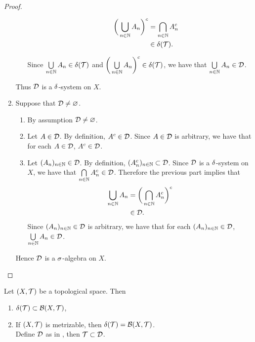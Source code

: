 \documentclass{book}
\begin{document}
\begin{proof}
\begin{enumerate}
\begin{enumerate}
\begin{itemize}
					\begin{align*}
						\bigg( \bigcup_{n \in \mathbb{N}} A_n \bigg)^c 
						& = \bigcap_{n \in \mathbb{N}} A_n^c \\
						& \in \delta(\mathcal{T}).
					\end{align*}
				\end{itemize}
				Since $\bigcup\limits_{n \in \mathbb{N}} A_n \in \delta(\mathcal{T})$ and $\bigg( \bigcup\limits_{n \in \mathbb{N}} A_n \bigg)^c \in \delta(\mathcal{T})$, we have that $\bigcup\limits_{n \in \mathbb{N}} A_n \in \mathcal{D}$. 
			\end{enumerate}
			Thus $\mathcal{D}$ is a $\delta$-system on $X$.
			\item Suppose that $\mathcal{D} \neq \varnothing$.
			\begin{enumerate}
				\item By assumption $\mathcal{D} \neq \varnothing$.
				\item Let $A \in \mathcal{D}$. By definition, $A^c \in \mathcal{D}$. Since $A \in \mathcal{D}$ is arbitrary, we have that for each $A \in \mathcal{D}$, $A^c \in \mathcal{D}$.
				\item Let $(A_n)_{n \in \mathbb{N}} \in \mathcal{D}$. By definition, $(A_n^c)_{n \in \mathbb{N}} \subset \mathcal{D}$. Since $\mathcal{D}$ is a $\delta$-system on $X$, we have that $\bigcap\limits_{n \in \mathbb{N}} A_n^c \in \mathcal{D}$. Therefore the previous part implies that
				\begin{align*}
					\bigcup_{n \in \mathbb{N}} A_n
					& = \bigg( \bigcap_{n \in \mathbb{N}} A_n^c \bigg)^c \\
					& \in \mathcal{D}. 
				\end{align*}
				Since $(A_n)_{n \in \mathbb{N}} \in \mathcal{D}$ is arbitrary, we have that for each $(A_n)_{n \in \mathbb{N}} \in \mathcal{D}$, $\bigcup\limits_{n \in \mathbb{N}} A_n \in \mathcal{D}$. 
			\end{enumerate}
			Hence $\mathcal{D}$ is a $\sigma$-algebra on $X$. 
		\end{enumerate}
	\end{proof}
	
	\begin{ex} 
		Let $(X, \mathcal{T})$ be a topological space. Then 
		\begin{enumerate}
			\item $\delta(\mathcal{T}) \subset \mathcal{B}(X, \mathcal{T})$,
			\item If $(X, \mathcal{T})$ is metrizable, then $\delta(\mathcal{T}) = \mathcal{B}(X, \mathcal{T})$.  \\
			 Define $\mathcal{D}$ as in , then $\mathcal{T} \subset \mathcal{D}$.
		\end{enumerate}
	\end{ex}
\end{document}
